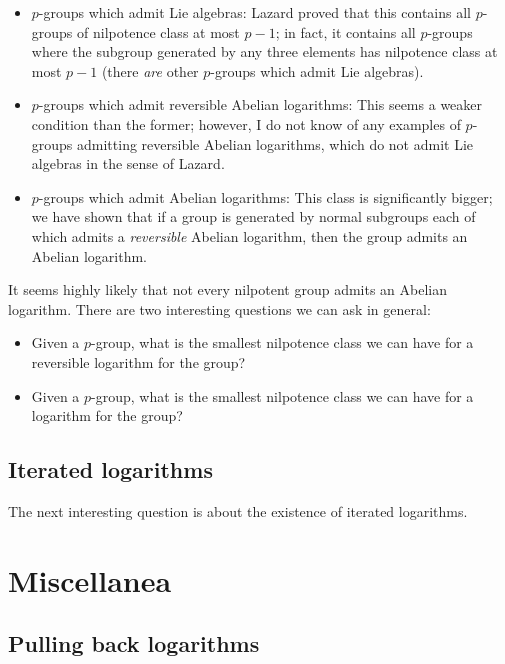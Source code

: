 \documentclass[a4paper]{amsart}
\begin{document}
\begin{itemize}

\item $p$-groups which admit Lie algebras: Lazard proved that this
  contains all $p$-groups of nilpotence class at most $p-1$; in fact,
  it contains all $p$-groups where the subgroup generated by any three
  elements has nilpotence class at most $p-1$ (there {\em are} other
  $p$-groups which admit Lie algebras).

\item $p$-groups which admit reversible Abelian logarithms: This seems
  a weaker condition than the former; however, I do not know of any
  examples of $p$-groups admitting reversible Abelian logarithms, which do
  not admit Lie algebras in the sense of Lazard.

\item $p$-groups which admit Abelian logarithms: This class is
  significantly bigger; we have shown that if a group is generated by
  normal subgroups each of which admits a {\em reversible} Abelian
  logarithm, then the group admits an Abelian logarithm.

\end{itemize}

It seems highly likely that not every nilpotent group admits an
Abelian logarithm. There are two interesting questions we can ask in
general:

\begin{itemize}

\item Given a $p$-group, what is the smallest nilpotence class we can
  have for a reversible logarithm for the group?

\item Given a $p$-group, what is the smallest nilpotence class we can
  have for a logarithm for the group?

\end{itemize}

\subsection{Iterated logarithms}

The next interesting question is about the existence of iterated
logarithms.


\section{Miscellanea}
\subsection{Pulling back logarithms}
\end{document}
